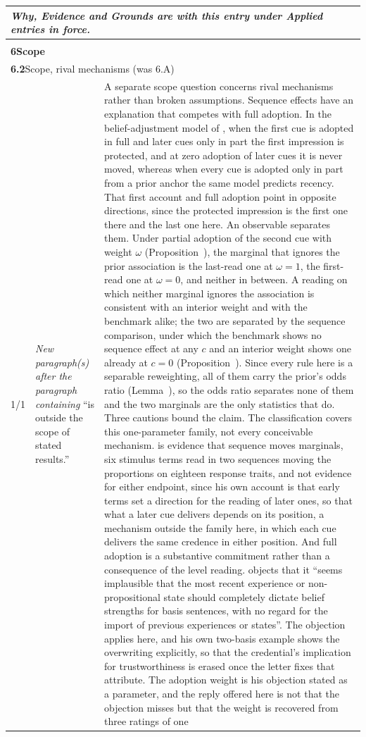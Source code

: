 \documentclass[10pt]{article}
\theoremstyle{definition}
\renewcommand{\ref}[1]{\textsc{\detokenize{#1}}}
\newlength{\fullw}\setlength{\fullw}{25.9cm}
\newcommand{\entryhead}[2]{\multicolumn{3}{|l|}{\rule{0pt}{2.6ex}\large\textbf{#1}\quad #2} \\ \hline}
\begin{document}
{\begin{longtable}{|p{0.9cm}|p{12.2cm}|p{12.2cm}|}
\multicolumn{3}{|p{\fullw}|}{\textit{Why, Evidence and Grounds are with this entry under Applied entries in force.}} \\ \hline
\multicolumn{3}{|l|}{} \\ \hline
\multicolumn{3}{|l|}{\rule{0pt}{3.2ex}\Large\textbf{6\quad Scope}} \\ \hline\hline
\entryhead{6.2}{Scope, rival mechanisms (was 6.A)\quad{\footnotesize\textit{(formerly E.11)}}}
1/1 & \textit{New paragraph(s) after the paragraph containing} ``is outside the scope of stated results.'' & A separate scope question concerns rival mechanisms rather than broken assumptions. Sequence effects have an explanation that competes with full adoption. In the belief-adjustment model of \citet{HogarthEinhorn1992}, when the first cue is adopted in full and later cues only in part the first impression is protected, and at zero adoption of later cues it is never moved, whereas when every cue is adopted only in part from a prior anchor the same model predicts recency. That first account and full adoption point in opposite directions, since the protected impression is the first one there and the last one here. An observable separates them. Under partial adoption of the second cue with weight $\omega$ (Proposition~\ref{prop:ADJ}), the marginal that ignores the prior association is the last-read one at $\omega=1$, the first-read one at $\omega=0$, and neither in between. A reading on which neither marginal ignores the association is consistent with an interior weight and with the benchmark alike; the two are separated by the sequence comparison, under which the benchmark shows no sequence effect at any $c$ and an interior weight shows one already at $c=0$ (Proposition~\ref{prop:ADJ}). Since every rule here is a separable reweighting, all of them carry the prior's odds ratio (Lemma~\ref{lem:SEP}), so the odds ratio separates none of them and the two marginals are the only statistics that do. Three cautions bound the claim. The classification covers this one-parameter family, not every conceivable mechanism. \citet{Asch1946} is evidence that sequence moves marginals, six stimulus terms read in two sequences moving the proportions on eighteen response traits, and not evidence for either endpoint, since his own account is that early terms set a direction for the reading of later ones, so that what a later cue delivers depends on its position, a mechanism outside the family here, in which each cue delivers the same credence in either position. And full adoption is a substantive commitment rather than a consequence of the level reading. \citet{Hawthorne2004} objects that it ``seems implausible that the most recent experience or non-propositional state should completely dictate belief strengths for basis sentences, with no regard for the import of previous experiences or states''. The objection applies here, and his own two-basis example shows the overwriting explicitly, so that the credential's implication for trustworthiness is erased once the letter fixes that attribute. The adoption weight is his objection stated as a parameter, and the reply offered here is not that the objection misses but that the weight is recovered from three ratings of one 
\end{longtable}}
\end{document}

